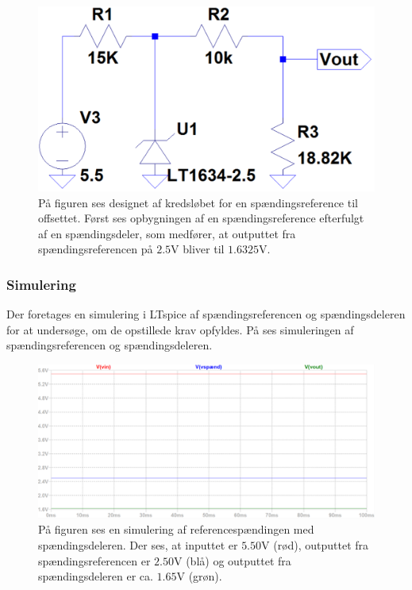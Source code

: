 \begin{figure}[H]
	\centering
	\includegraphics[scale=.5]{figures/cProblemloesning/OffsetSpaendingsRef2.PNG}
	\caption{På figuren ses designet af kredsløbet for en spændingsreference til offsettet. Først ses opbygningen af en spændingsreference efterfulgt af en spændingsdeler, som medfører, at outputtet fra spændingsreferencen på $2.5$V bliver til $1.6325$V.}
	\label{fig:Spaendingsreference_offset}
\end{figure}

\subsubsection{Simulering}
Der foretages en simulering i LTspice af spændingsreferencen og spændingsdeleren for at undersøge, om de opstillede krav opfyldes. På  ses simuleringen af spændingsreferencen og spændingsdeleren.

\begin{figure}[H]
	\centering
	\includegraphics[scale=.37]{figures/cProblemloesning/Reference_sim_off.PNG}
	\caption{På figuren ses en simulering af referencespændingen med spændingsdeleren. Der ses, at inputtet er $5.50$V (rød), outputtet fra spændingsreferencen er $2.50$V (blå) og outputtet fra spændingsdeleren er ca. $1.65$V (grøn).}
	\label{fig:Spaendingsreference_offset_sim}
\end{figure}

